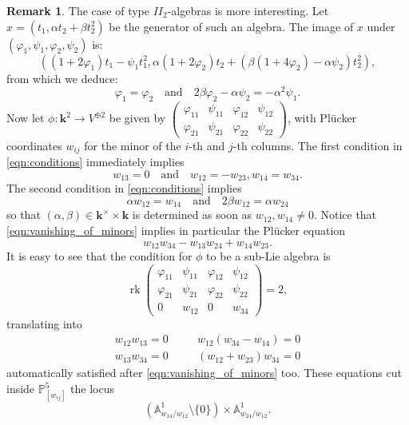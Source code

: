 \documentclass[11pt]{amsart}
\newcommand{\PP}{\mathbb P}
\renewcommand{\k}{\mathbf k}
\renewcommand{\to}{\rightarrow}
\newcommand{\Aaff}{\mathbb A}
\theoremstyle{plain}
\theoremstyle{definition}
\newtheorem{rem}[thm]{Remark}
\begin{document}
\begin{rem}
 The case of type $I\!I_2$-algebras is more interesting. Let $x=(t_1,\alpha t_2+\beta t_2^2)$ be the generator of such an algebra. The image of $x$ under $(\varphi_1,\psi_1,\varphi_2,\psi_2)$ is:
 \[\left((1+2\varphi_1)t_1-\psi_1t_1^2,\alpha(1+2\varphi_2)t_2+(\beta(1+4\varphi_2)-\alpha\psi_2)t_2^2\right),\]
 from which we deduce:
 \begin{equation}\label{eqn:conditions}
 \varphi_1=\varphi_2\quad\text{and}\quad 2\beta\varphi_2-\alpha\psi_2=-\alpha^2\psi_1.
 \end{equation}
 Now let $\phi\colon\k^2\to V^{\oplus 2}$ be given by $\begin{pmatrix} \varphi_{11} & \psi_{11} & \varphi_{12} & \psi_{12} \\ \varphi_{21} & \psi_{21} & \varphi_{22} & \psi_{22}\end{pmatrix}$, with Pl\"ucker coordinates $w_{ij}$ for the minor of the $i$-th and $j$-th columns. The first condition in \eqref{eqn:conditions} immediately implies 
 \begin{equation}\label{eqn:vanishing_of_minors}
  w_{13}=0\quad\text{and}\quad w_{12}=-w_{23},w_{14}=w_{34}.
 \end{equation}
 The second condition in \eqref{eqn:conditions} implies
 \begin{equation}\label{eqn:nonvan_of_minors}
  \alpha w_{12}=w_{14}\quad\text{and}\quad 2\beta w_{12}=\alpha w_{24}
  \end{equation}
 so that $(\alpha,\beta)\in\k^\times\times\k$ is determined as soon as $w_{12},w_{14}\neq 0$. Notice that \eqref{eqn:vanishing_of_minors} implies in particular the Pl\"ucker equation \[w_{12}w_{34}-w_{13}w_{24}+w_{14}w_{23}.\]
 It is easy to see that the condition for $\phi$ to be a sub-Lie algebra is
 \[\operatorname{rk}\begin{pmatrix} \varphi_{11} & \psi_{11} & \varphi_{12} & \psi_{12} \\ \varphi_{21} & \psi_{21} & \varphi_{22} & \psi_{22} \\ 0 & w_{12} & 0 & w_{34} \end{pmatrix}=2,\]
 translating into 
 \begin{align*}
  w_{12}w_{13}=0 & \quad & w_{12}(w_{34}-w_{14})=0 \\ w_{13}w_{34}=0 & \quad & (w_{12}+w_{23})w_{34}=0
 \end{align*}
 automatically satisfied after \eqref{eqn:vanishing_of_minors} too. These equations cut inside $\PP^5_{[w_{ij}]}$ the locus \[(\Aaff^1_{{w_{14}}/{w_{12}}}\setminus\{0\})\times\Aaff^1_{{w_{24}}/{w_{12}}}.\]

\end{rem}
\end{document}
